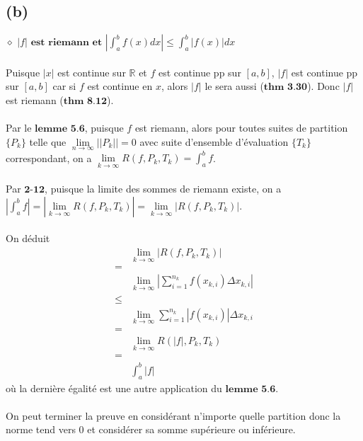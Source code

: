 \documentclass[a4paper,10pt]{article}
\begin{document}
\subsection*{(b)}
$\diamond$ $|f| \textbf{ est riemann et } \left|\int_a^b f(x)dx \right| \leq \int_a^b |f(x)| dx$
\\
\\
Puisque $|x|$ est continue sur $\mathbb{R}$ et $f$ est continue pp sur $[a,b]$, $|f|$ est continue pp sur $[a,b]$ car si
$f$ est continue en $x$, alors $|f|$ le sera aussi ($\textbf{thm 3.30}$). Donc $|f|$ est riemann ($\textbf{thm 8.12}$).
\\
\\
Par le $\textbf{lemme 5.6}$, puisque $f$ est riemann, alors pour toutes suites de partition $\{P_k\}$ telle que 
$\lim\limits_{n \to \infty} || P_k || = 0$ avec suite d'ensemble d'évaluation $\{T_k\}$ correspondant, on a 
$\lim\limits_{k \to \infty} R(f, P_k, T_k) = \int_a^b f$.
\\
\\
Par $\textbf{2-12}$, puisque la limite des sommes de riemann existe, on a $\left|\int_a^b f\right| = 
\left|\lim\limits_{k \to \infty} R(f, P_k, T_k)\right|
= \lim\limits_{k \to \infty} \left| R(f, P_k, T_k) \right|$.
\\
\\
On déduit
\begin{align*}
  & \lim\limits_{k \to \infty} \left| R(f, P_k, T_k) \right| \\
  = \\
  & \lim\limits_{k \to \infty} \left| \sum_{i = 1}^{n_k} f(x_{k,i}) \Delta x_{k,i} \right| \\
  \leq \\
  & \lim\limits_{k \to \infty} \sum_{i = 1}^{n_k} |f(x_{k,i})| \Delta x_{k,i} \\
  = \\
  & \lim\limits_{k \to \infty} R(|f|, P_k, T_k) \\
  = \\
  & \int_a^b |f|
\end{align*}
où la dernière égalité est une autre application du $\textbf{lemme 5.6}$.
\\
\\
On peut terminer la preuve en considérant n'importe quelle partition donc la norme tend vers 0 et considérer sa 
somme supérieure ou inférieure.
\end{document}

